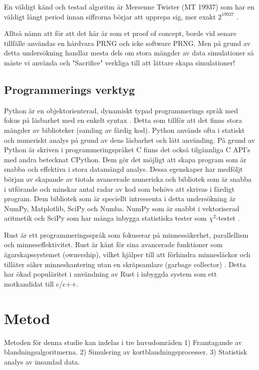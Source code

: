 \documentclass[swedish,a4paper]{article}
\begin{document}
En väldigt känd och testad algoritm är Mersenne Twister (MT 19937) som
har en väldigt långt period innan siffrorna börjar att upprepa sig, mer
exakt $2^{19937}$ \parencite{mersenne_twister}.

Alltså nämn att för att det här är som et proof of concept, borde vid
senare tillfälle användas en hårdvara PRNG och icke software PRNG.
Men på grund av detta undersökning handlar mesta dels om stora mängder av data
simulationer så måste vi använda och "Sacrifice" verkliga till att lättare
skapa simulationer!

\subsection{Programmerings verktyg}
\label{sec:verktyg}
Python är en objektorienterad, dynamiskt typad programmerings språk med
fokus på läsbarhet med en enkelt syntax \parencite{python}. Detta  som tillför att det finns stora
mängder av biblioteker (samling av färdig kod).
Python används ofta i statiskt och numeriskt analys på grund av dens
läsbarhet och lätt använding. På grund av Python är skriven i
programmeringspråket C finns det också tilgännliga C API's med andra
betecknat CPython. Dem gör det möjligt att skapa program som är snabba
och effektiva i stora datamängd analys. Dessa egenskaper har medföljt
början av skapande av tiotals avancerade numeriska och
bibliotek som är snabba i utförande och minskar antal radar av kod som
behövs att skrivas i färdigt program. Dem bibliotek som är speciellt
intressenta i detta undersökning är NumPy, Matplotlib, SciPy och Numba.
NumPy som är snabbt i vektoriserad aritmetik och SciPy som har många
inbygga statistiska tester som $\chi^2$-testet \parencite{numpy, scipy}.

Rust är ett programmeringsspråk som fokuserar på
minnessäkerhet, parallellism och minneseffektivitet. Rust är känt för
sina avancerade funktioner som ägarskapssystemet (ownership), vilket
hjälper till att förhindra minnesläckor och tillåter säker
minneshantering utan en skräpsamlare (garbage collector)
\parencite{rust}. Detta har ökad populäritet i användning av Rust i
inbyggda system som ett motkandidat till c/c++. 

\section{Metod} 
Metoden för denna studie kan indelas i tre huvudområden
1) Framtagande av  blandningsalgoritmerna. 
2) Simulering av kortblandningsprocesser. 
3) Statistisk analys av insamlad data.
\end{document}
